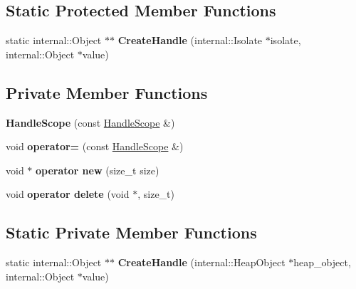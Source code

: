 \subsection*{Static Protected Member Functions}
\begin{DoxyCompactItemize}
\item 
static internal\+::\+Object $\ast$$\ast$ {\bfseries Create\+Handle} (internal\+::\+Isolate $\ast$isolate, internal\+::\+Object $\ast$value)\hypertarget{classv8_1_1_handle_scope_a3f63aa8552a0371606305f58187d80e2}{}\label{classv8_1_1_handle_scope_a3f63aa8552a0371606305f58187d80e2}

\end{DoxyCompactItemize}
\subsection*{Private Member Functions}
\begin{DoxyCompactItemize}
\item 
{\bfseries Handle\+Scope} (const \hyperlink{classv8_1_1_handle_scope}{Handle\+Scope} \&)\hypertarget{classv8_1_1_handle_scope_a7c62e10404e105ec74b86b5d7d5e04fe}{}\label{classv8_1_1_handle_scope_a7c62e10404e105ec74b86b5d7d5e04fe}

\item 
void {\bfseries operator=} (const \hyperlink{classv8_1_1_handle_scope}{Handle\+Scope} \&)\hypertarget{classv8_1_1_handle_scope_a1529e8892e4ec96a845f6dea18f2c2ec}{}\label{classv8_1_1_handle_scope_a1529e8892e4ec96a845f6dea18f2c2ec}

\item 
void $\ast$ {\bfseries operator new} (size\+\_\+t size)\hypertarget{classv8_1_1_handle_scope_a1dd92d6bbc0bf64a66f968e08dad00a2}{}\label{classv8_1_1_handle_scope_a1dd92d6bbc0bf64a66f968e08dad00a2}

\item 
void {\bfseries operator delete} (void $\ast$, size\+\_\+t)\hypertarget{classv8_1_1_handle_scope_ab8ba9daf1a4af951e258c1d4a0f7257c}{}\label{classv8_1_1_handle_scope_ab8ba9daf1a4af951e258c1d4a0f7257c}

\end{DoxyCompactItemize}
\subsection*{Static Private Member Functions}
\begin{DoxyCompactItemize}
\item 
static internal\+::\+Object $\ast$$\ast$ {\bfseries Create\+Handle} (internal\+::\+Heap\+Object $\ast$heap\+\_\+object, internal\+::\+Object $\ast$value)\hypertarget{classv8_1_1_handle_scope_ae8423afe03e4686992deebe9a9b8e7df}{}\label{classv8_1_1_handle_scope_ae8423afe03e4686992deebe9a9b8e7df}

\end{DoxyCompactItemize}
